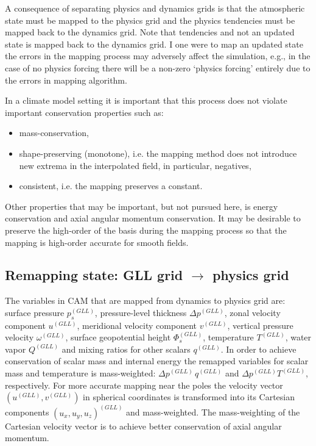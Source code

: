\documentclass[twocol]{ametsoc}
\begin{document}
A consequence of separating physics and dynamics grids is that the atmospheric state must be mapped to the physics grid and the physics tendencies must be mapped back to the dynamics grid. Note that tendencies and not an updated state is mapped back to the dynamics grid. I one were to map an updated state the errors in the mapping process may adversely affect the simulation, e.g., in the case of no physics forcing there will be a non-zero `physics forcing' entirely due to the errors in mapping algorithm.

In a climate model setting it is important that this process does not violate important conservation properties such as:
\begin{itemize}
\item mass-conservation,
\item shape-preserving (monotone), i.e. the mapping method does not introduce new extrema in the interpolated field, in particular, negatives,
\item consistent, i.e. the mapping preserves a constant.
\end{itemize}
Other properties that may be important, but not pursued here, is energy conservation and axial angular momentum conservation. It may be desirable to preserve the high-order of the basis during the mapping process so that the mapping is high-order accurate for smooth fields. 


\subsection{Remapping state: GLL grid $\rightarrow$ physics grid}
The variables in CAM that are mapped from dynamics to physics grid are: surface pressure $p_s^{(GLL)}$, pressure-level thickness $\Delta p^{(GLL)}$, zonal velocity component $u^{(GLL)}$, meridional velocity component $v^{(GLL)}$, vertical pressure velocity $\omega^{(GLL)}$, surface geopotential height $\Phi_s^{(GLL)}$, temperature $T^{(GLL)}$, water vapor $Q^{(GLL)}$ and mixing ratios for other scalars $q^{(GLL)}$. In order to achieve conservation of scalar mass and internal energy the remapped variables for scalar mass and temperature is mass-weighted: $\Delta p^{(GLL)}\, q^{(GLL)}$ and $\Delta p^{(GLL)} T^{(GLL)}$, respectively. For more accurate mapping near the poles the velocity vector $(u^{(GLL)},v^{(GLL)})$ in spherical coordinates is transformed into its Cartesian components $(u_x,u_y,u_z)^{(GLL)}$ and mass-weighted. The mass-weighting of the Cartesian velocity vector is to achieve better conservation of axial angular momentum.
\end{document}
